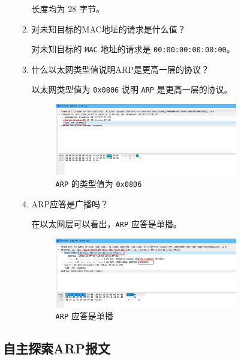 \documentclass{article}
\begin{document}
\begin{enumerate}[noitemsep]
\begin{enumerate}
		长度均为 28 字节。
		\item 对未知目标的MAC地址的请求是什么值？
		
		对未知目标的 \texttt{MAC} 地址的请求是 \texttt{00:00:00:00:00:00}。
		\item 什么以太网类型值说明ARP是更高一层的协议？
		
		以太网类型值为 \texttt{0x0806} 说明 \texttt{ARP} 是更高一层的协议。
		
		\begin{figure}[H]
			\centering
			\includegraphics[width=0.8\textwidth]{img/8.png}
			\caption{\texttt{ARP} 的类型值为 \texttt{0x0806}}
			\label{fig:8}
		\end{figure}
		\item ARP应答是广播吗？
		
		在以太网层可以看出，\texttt{ARP} 应答是单播。
		
		\begin{figure}[H]
			\centering
			\includegraphics[width=0.8\textwidth]{img/9.png}
			\caption{\texttt{ARP} 应答是单播}
			\label{fig:9}
		\end{figure}
	\end{enumerate}
	
\end{enumerate}

\subsection{自主探索ARP报文}
\end{document}
